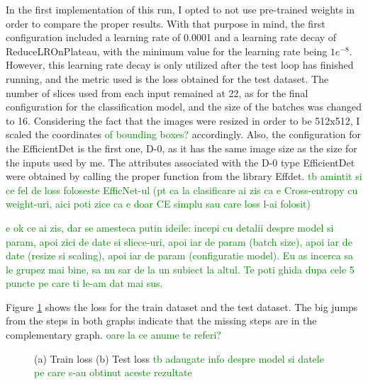 In the first implementation of this run, I opted to not use pre-trained weights in order to compare the proper results. With that purpose in mind, the first configuration included a learning rate of 0.0001 and a learning rate decay of ReduceLROnPlateau, with the minimum value for the learning rate being \(1e^{-8}\). However, this learning rate decay is only utilized after the test loop has finished running, and the metric used is the loss obtained for the test dataset. The number of slices used from each input remained at 22, as for the final configuration for the classification model, and the size of the batches was changed to 16. Considering the fact that the images were resized in order to be 512x512, I scaled the coordinates 
\textcolor{green}{of bounding boxes?} 
accordingly. Also, the configuration for the EfficientDet is the first one, D-0, as it has the same image size as the size for the inputs used by me. The attributes associated with the D-0 type EfficientDet were obtained by calling the proper function from the library Effdet. 
\textcolor{green}{tb amintit si ce fel de loss foloseste EfficNet-ul (pt ca la clasificare ai zis ca e Cross-entropy cu weight-uri, aici poti zice ca e doar CE simplu sau care loss l-ai folosit)}

\textcolor{green}{e ok ce ai zis, dar se amesteca putin ideile: incepi cu detalii despre model si param, apoi zici de date si sliece-uri, apoi iar de param (batch size), apoi iar de date (resize si scaling), apoi iar de param (configuratie model). Eu as incerca sa le grupez mai bine, sa nu sar de la un subiect la altul. Te poti ghida dupa cele 5 puncte pe care ti le-am dat mai sus.}

Figure \ref{fig:fig23} shows the loss for the train dataset and the test dataset. The big jumps from the steps in both graphs indicate that the missing steps are in the complementary graph. 
\textcolor{green}{oare la ce anume te referi?}

\begin{figure}[!ht]
    \caption{(a) Train loss (b) Test loss
    \textcolor{green}{tb adaugate info despre model si datele pe care s-au obtinut aceste rezultate}
    }
    \label{fig:fig23}
\end{figure}

